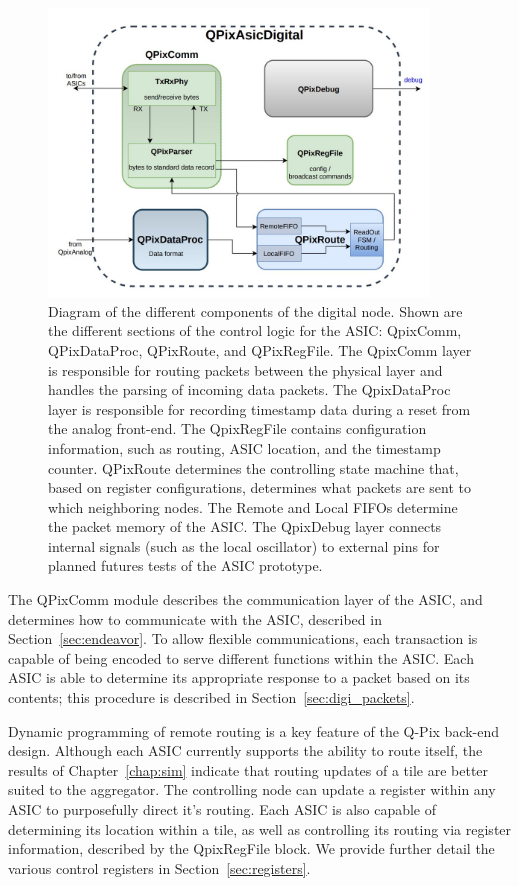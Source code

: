 \begin{figure}[]
\centering
\includegraphics[width=0.9\textwidth]{images/digital_node_overview.jpg}
\caption{Diagram of the different components of the digital node.
  Shown are the different sections of the control logic for the ASIC: QpixComm, QPixDataProc, QPixRoute, and QPixRegFile.
  The QpixComm layer is responsible for routing packets between the physical layer and handles the parsing of incoming data packets.
  The QpixDataProc layer is responsible for recording timestamp data during a reset from the analog front-end.
  The QpixRegFile contains configuration information, such as routing, ASIC location, and the timestamp counter.
  QPixRoute determines the controlling state machine that, based on register configurations, determines what packets are sent to which neighboring nodes.
  The Remote and Local FIFOs determine the packet memory of the ASIC. 
  The QpixDebug layer connects internal signals (such as the local oscillator) to external pins for planned futures tests of the ASIC prototype.
  }
\label{fig:qpa_diagram}
\end{figure}

The QPixComm module describes the communication layer of the ASIC, and determines how to communicate with the ASIC, described in Section~\ref{sec:endeavor}.
To allow flexible communications, each transaction is capable of being encoded to serve different functions within the ASIC.
Each ASIC is able to determine its appropriate response to a packet based on its contents; this procedure is described in Section~\ref{sec:digi_packets}.

Dynamic programming of remote routing is a key feature of the Q-Pix back-end design.
Although each ASIC currently supports the ability to route itself, the results of Chapter~\ref{chap:sim} indicate that routing updates of a tile are better suited to the aggregator.
The controlling node can update a register within any ASIC to purposefully direct it's routing.
Each ASIC is also capable of determining its location within a tile, as well as controlling its routing via register information, described by the QpixRegFile block.
We provide further detail the various control registers in Section~\ref{sec:registers}.

